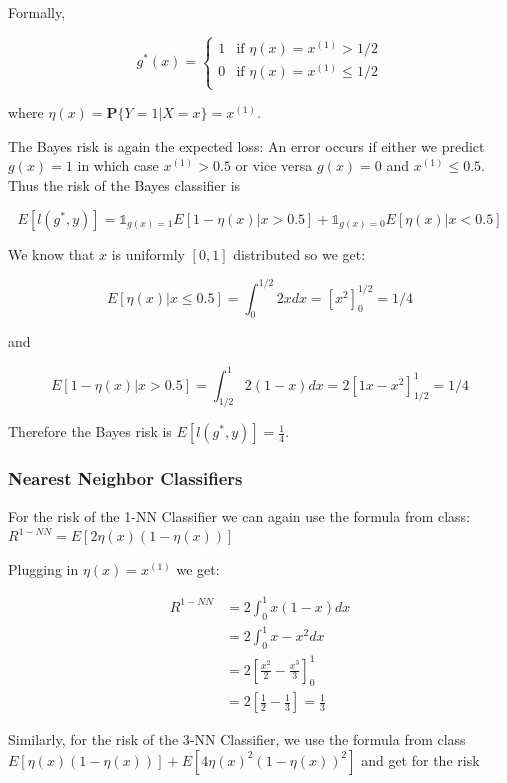 \documentclass[a4paper, 11pt]{article} %
\begin{document}
Formally,

$$g^*(x) = \left\{ \begin{array}{ ll} {1} & {\text {if } \eta(x) = x ^ { ( 1 ) } >  1/2 } \\
{0} & {\text{if } \eta(x) = x ^ { ( 1 ) }   \leq 1/2 } \\
\end{array} \right. $$

where $\eta(x) = \mathbf { P } \{ Y = 1 | X = x \} = x ^ { ( 1 ) }$.

The Bayes risk is again the expected loss:
An error occurs if either we predict $g(x) = 1$ in which case $x^{(1)} > 0.5$ or vice versa $g(x) = 0$ and $x^{(1)} \leq 0.5$. Thus the risk of the Bayes classifier is


$$E\left[l(g^*,y)\right] = \mathbb{1}_{g(x) = 1}E[1- \eta(x)| x>0.5  ] + \mathbb{1}_{g(x) = 0} E[ \eta(x) | x <0.5 ]$$

We know that $x$ is uniformly $[0,1]$ distributed so we get: 

$$E[\eta(x) | x \leq 0.5] = \int _ { 0 } ^ { 1 / 2 } 2 x d x = \left[ x ^ { 2 } \right] _ { 0 } ^ { 1 / 2 } = 1 / 4$$

and

$$E[1 -\eta(x) | x > 0.5] = \int _ { 1/2 } ^ { 1 } 2 (1-x) d x =  2\left[ 1x - x ^ { 2 } \right] _ { 1/2 } ^ { 1 } = 1 / 4$$


Therefore the Bayes risk is $E\left[l(g^*,y)\right] = \frac{1}{4}$.

\subsubsection*{Nearest Neighbor Classifiers}

For the risk of the 1-NN Classifier we can again use the formula from class: $R ^ { 1 - N N } = E [ 2 \eta ( x ) ( 1 - \eta ( x ) ) ]$

Plugging in $\eta(x) =  x ^ { ( 1 ) }$ we get:

\begin{align*}
R ^ { 1 - N N } &= 2 \int _ { 0 } ^ { 1 } x ( 1 - x ) d x \\
&= 2\int _ { 0 } ^ { 1 } x - x ^ { 2 } d x \\
&= 2 \left[ \frac { x ^ { 2 } } { 2 } - \frac { x ^ { 3 } } { 3 } \right] _ { 0 } ^ { 1 } \\
&= 2 \left[ \frac { 1 } { 2 } - \frac { 1 } { 3 } \right]  = \frac{1}{3}
\end{align*}

Similarly, for the risk of the 3-NN Classifier, we use the formula from class $E [ \eta ( x ) ( 1 - \eta ( x ) ) ] + E \left[ 4 \eta ( x ) ^ { 2 } ( 1 - \eta ( x ) ) ^ { 2 } \right]$ and get for the risk
\end{document}
